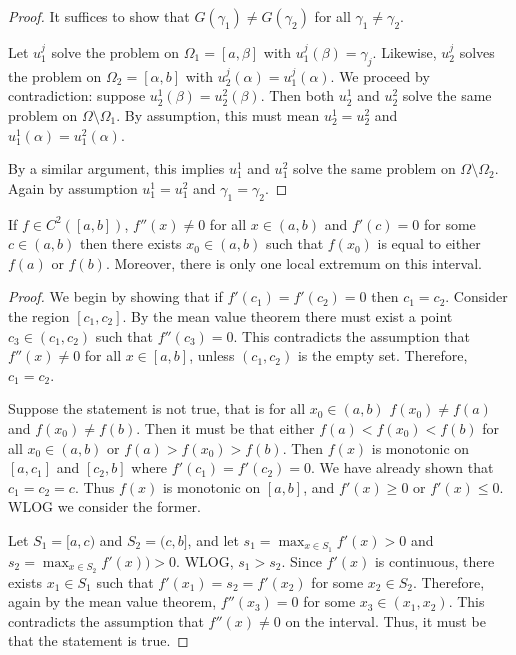 \documentclass{book}
\begin{document}
\begin{proof}
It suffices to show that $G(\gamma_1) \neq G(\gamma_2)$ for all $\gamma_1 \neq \gamma_2$.

Let $u^j_1$ solve the problem on $\Omega_1 = [a,\beta]$ with $u^j_1(\beta) = \gamma_j$.
Likewise, $u^j_2$ solves the problem on $\Omega_2 = [\alpha, b]$ with $u^j_2(\alpha) = u^j_1(\alpha)$.
We proceed by contradiction:
suppose $u^1_2(\beta) = u^2_2(\beta)$.
Then both $u^1_2$ and $u^2_2$ solve the same problem on $\Omega \setminus \Omega_1$.
By assumption, this must mean $u^1_2 = u^2_2$ and $u^1_1(\alpha) = u^2_1(\alpha)$.

By a similar argument, this implies $u^1_1$ and $u^2_1$ solve the same problem on $\Omega \setminus \Omega_2$.
Again by assumption $u^1_1 = u^2_1$ and $\gamma_1 = \gamma_2$.
\end{proof}

\begin{lemma}
If $f \in C^2([a,b])$, $f''(x) \neq 0$ for all $x \in (a,b)$ and $f'(c) = 0$ for some $c \in (a,b)$ then there exists $x_0 \in (a,b)$ such that $f(x_0)$ is equal to either $f(a)$ or $f(b)$.
Moreover, there is only one local extremum on this interval.
\end{lemma}

\begin{proof}
We begin by showing that if $f'(c_1) = f'(c_2) = 0$ then $c_1 = c_2$.
Consider the region $[c_1,c_2]$.
By the mean value theorem there must exist a point $c_3 \in (c_1,c_2)$ such that $f''(c_3) = 0$.
This contradicts the assumption that $f''(x) \neq 0$ for all $x \in [a,b]$, unless $(c_1,c_2)$ is the empty set.
Therefore, $c_1 = c_2$.

Suppose the statement is not true, that is for all $x_0 \in (a,b)$ $f(x_0) \neq f(a)$ and $f(x_0) \neq f(b)$.
Then it must be that either $f(a) < f(x_0) < f(b)$ for all $x_0 \in (a,b)$ or $f(a) > f(x_0) > f(b)$.
Then $f(x)$ is monotonic on $[a,c_1]$ and $[c_2,b]$ where $f'(c_1) = f'(c_2) = 0$.
We have already shown that $c_1 = c_2 = c$.
Thus $f(x)$ is monotonic on $[a,b]$, and $f'(x) \geq 0$ or $f'(x) \leq 0$.
WLOG we consider the former.

Let $S_1 = [a,c)$ and $S_2 = (c,b]$, and let $s_1 = \max_{x \in S_1} f'(x) > 0$ and $s_2 = \max_{x \in S_2} f'(x)) > 0$.
WLOG, $s_1 > s_2$.
Since $f'(x)$ is continuous, there exists $x_1 \in S_1$ such that $f'(x_1) = s_2 = f'(x_2)$ for some $x_2 \in S_2$.
Therefore, again by the mean value theorem, $f''(x_3) = 0$ for some $x_3 \in (x_1,x_2)$.
This contradicts the assumption that $f''(x) \neq 0$ on the interval.
Thus, it must be that the statement is true.
\end{proof}
\end{document}
